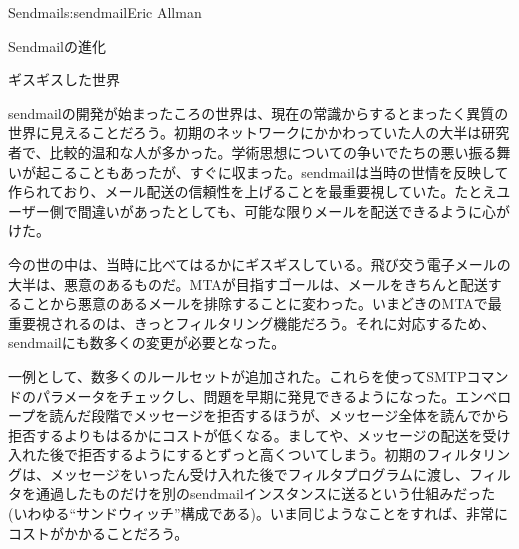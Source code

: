 \begin{aosachapter}{Sendmail}{s:sendmail}{Eric Allman}
\begin{aosasect1}{Sendmailの進化}
\begin{aosasect2}{ギスギスした世界}

sendmailの開発が始まったころの世界は、現在の常識からするとまったく異質の世界に見えることだろう。初期のネットワークにかかわっていた人の大半は研究者で、比較的温和な人が多かった。学術思想についての争いでたちの悪い振る舞いが起こることもあったが、すぐに収まった。sendmailは当時の世情を反映して作られており、メール配送の信頼性を上げることを最重要視していた。たとえユーザー側で間違いがあったとしても、可能な限りメールを配送できるように心がけた。

今の世の中は、当時に比べてはるかにギスギスしている。飛び交う電子メールの大半は、悪意のあるものだ。MTAが目指すゴールは、メールをきちんと配送することから悪意のあるメールを排除することに変わった。いまどきのMTAで最重要視されるのは、きっとフィルタリング機能だろう。それに対応するため、sendmailにも数多くの変更が必要となった。

一例として、数多くのルールセットが追加された。これらを使ってSMTPコマンドのパラメータをチェックし、問題を早期に発見できるようになった。エンベロープを読んだ段階でメッセージを拒否するほうが、メッセージ全体を読んでから拒否するよりもはるかにコストが低くなる。ましてや、メッセージの配送を受け入れた後で拒否するようにするとずっと高くついてしまう。初期のフィルタリングは、メッセージをいったん受け入れた後でフィルタプログラムに渡し、フィルタを通過したものだけを別のsendmailインスタンスに送るという仕組みだった(いわゆる``サンドウィッチ''構成である)。いま同じようなことをすれば、非常にコストがかかることだろう。


\end{aosasect2}
\end{aosasect1}
\end{aosachapter}
